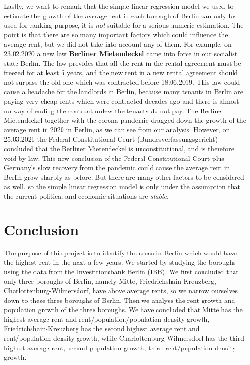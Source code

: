 \documentclass[11pt]{article}
\begin{document}
    Lastly, we want to remark that the simple linear regression model we
used to estimate the growth of the average rent in each borough of
Berlin can only be used for ranking purpose, it is \emph{not} suitable
for a serious numeric estimation. The point is that there are so many
important factors which could influence the average rent, but we did not
take into account any of them. For example, on 23.02.2020 a new law
\textbf{Berliner Mietendeckel} came into force in our socialist state
Berlin. The law provides that all the rent in the rental agreement must
be freezed for at least 5 years, and the new rent in a new rental
agreement should not surpass the old one which was contracted before
18.06.2019. This law could cause a headache for the landlords in Berlin,
because many tenants in Berlin are paying very cheap rents which were
contracted decades ago and there is almost no way of ending the contract
unless the tenants do not pay. The Berliner Mietendeckel together with
the corona-pandemic dragged down the growth of the average rent in 2020
in Berlin, as we can see from our analysis. However, on 25.03.2021 the
Federal Constitutional Court (Bundesverfassungsgericht) concluded that
the Berliner Mietendeckel is unconstitutional, and is therefore void by
law. This new conclusion of the Federal Constitutional Court plus
Germany's slow recovery from the pandemic could cause the average rent
in Berlin grow sharply as before. But there are many other factors to be
considered as well, so the simple linear regression model is only under
the assumption that the current political and economic situations are
\emph{stable}.

    \hypertarget{conclusion}{%
\section{\texorpdfstring{Conclusion
}{Conclusion }}\label{conclusion}}

    The purpose of this project is to identify the areas in Berlin which
would have the highest rent in the next a few years. We started by
studying the boroughs using the data from the Investitionsbank Berlin
(IBB). We first concluded that only three boroughs of Berlin, namely
Mitte, Friedrichshain-Kreuzberg, Charlottenburg-Wilmersdorf, have above
average rents, so we narrow ourselves down to these three boroughs of
Berlin. Then we analyse the rent growth and population growth of the
three boroughs. We have concluded that Mitte has the highest average
rent and rent/population/population-density growth,
Friedrichshain-Kreuzberg has the second highest average rent and
rent/population-density growth, while Charlottenburg-Wilmersdorf has the
third highest average rent, second population growth, third
rent/population-density growth.
\end{document}
